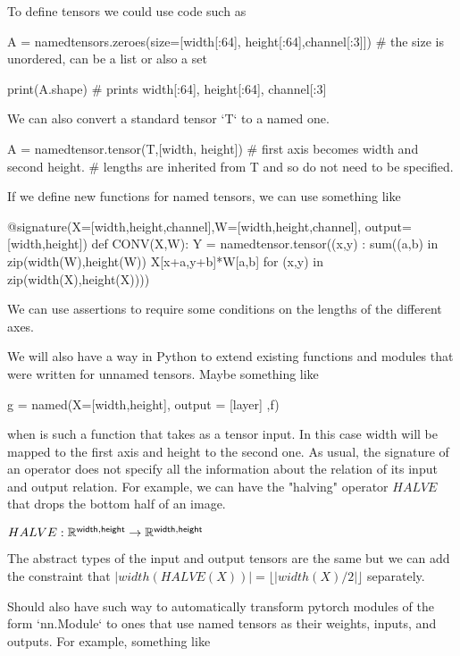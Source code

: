 \documentclass{article}
\begin{document}
To define tensors we could use code such as 

\begin{python}
A = namedtensors.zeroes(size=[width[:64], height[:64],channel[:3]])
# the size is unordered, can be a list or also a set

print(A.shape)
# prints { width[:64], height[:64], channel[:3] }
\end{python}

We can also convert a standard  tensor `T` to a named one.
 
\begin{python}
A = namedtensor.tensor(T,[width, height]) 
# first axis becomes width and second height.
# lengths are inherited from T and so do not need to be specified.
\end{python}


If we define new functions for named tensors, we can use something like

\begin{python}
  @signature(X=[width,height,channel],W=[width,height,channel], output=[width,height])
  def CONV(X,W):
      Y = namedtensor.tensor({(x,y) : sum((a,b) in zip(width(W),height(W)) X[x+a,y+b]*W[a,b]} for (x,y) in zip(width(X),height(X))))  
\end{python}
We can use assertions to require some conditions on the lengths of the different axes.



We will also have a way in Python to extend existing functions and modules that were written for unnamed tensors.
Maybe something like

\begin{python}
g = named(X=[width,height], output = [layer] ,f)
\end{python}
when  is such a function that takes  as a tensor input. In this case width will be mapped to the first axis and height to the second one. 
As usual, the signature of an operator does not specify all the information about the relation of its input and output relation. For example, we can have the "halving" operator $HALVE$ that drops the bottom half of an image.

$HALVE:\mathbb{R}^{\mathsf{width},\mathsf{height}} \rightarrow \mathbb{R}^{\mathsf{width},\mathsf{height}}$

The abstract types of the input and output tensors are the same but we can add the constraint that $|width(HALVE(X))|=\lfloor |width(X)/2| \rfloor$ separately.


Should also have such way to automatically transform pytorch modules of the form `nn.Module` to ones that use named tensors as their weights, inputs, and outputs.
For example, something like 
\end{document}
